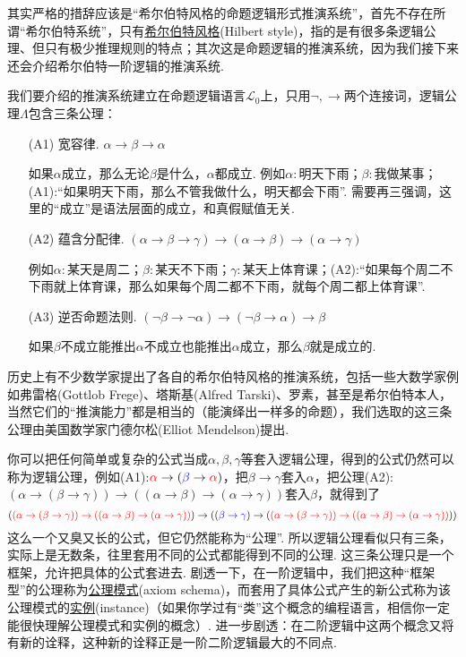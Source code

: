 \documentclass[main.tex]{subfiles}
\begin{document}
其实严格的措辞应该是“希尔伯特风格的命题逻辑形式推演系统”，首先不存在所谓“希尔伯特系统”，只有\uline{希尔伯特风格}(Hilbert style)，指的是有很多条逻辑公理、但只有极少推理规则的特点；其次这是命题逻辑的推演系统，因为我们接下来还会介绍希尔伯特一阶逻辑的推演系统. 

我们要介绍的推演系统建立在命题逻辑语言\(\mathcal{L}_0\)上，只用\(\neg, \to\)两个连接词，逻辑公理\(\Lambda\)包含三条公理：
\begin{itemize}
    \item [(A1)] 宽容律. \(\alpha \to \beta \to \alpha\)
    \begin{note}
        如果\(\alpha\)成立，那么无论\(\beta\)是什么，\(\alpha\)都成立. 例如\(\alpha:\)明天下雨；\(\beta:\)我做某事；(A1):“如果明天下雨，那么不管我做什么，明天都会下雨”. 需要再三强调，这里的“成立”是语法层面的成立，和真假赋值无关.
    \end{note}
    \item [(A2)] 蕴含分配律. \((\alpha \to \beta \to \gamma) \to (\alpha \to \beta) \to (\alpha \to \gamma)\)
    \begin{note}
        例如\(\alpha:\)某天是周二；\(\beta:\)某天不下雨；\(\gamma:\)某天上体育课；(A2):“如果每个周二不下雨就上体育课，那么如果每个周二都不下雨，就每个周二都上体育课”.
    \end{note}
    \item [(A3)] 逆否命题法则. \((\neg \beta \to \neg \alpha) \to (\neg \beta \to \alpha) \to \beta\)
    \begin{note}
        如果\(\beta\)不成立能推出\(\alpha\)不成立也能推出\(\alpha\)成立，那么\(\beta\)就是成立的.
    \end{note}
\end{itemize}

历史上有不少数学家提出了各自的希尔伯特风格的推演系统，包括一些大数学家例如弗雷格(Gottlob Frege)、塔斯基(Alfred Tarski)、罗素，甚至是希尔伯特本人，当然它们的“推演能力”都是相当的（能演绎出一样多的命题），我们选取的这三条公理由美国数学家门德尔松(Elliot Mendelson)提出.

你可以把任何简单或复杂的公式当成\(\alpha,\beta,\gamma\)等套入逻辑公理，得到的公式仍然可以称为逻辑公理，例如(A1):\({\color{red}\alpha} \to ({\color{blue}\beta} \to {\color{red}\alpha})\)，把\(\beta \to \gamma\)套入\(\alpha\)，把公理(A2):\((\alpha \to (\beta \to \gamma)) \to ((\alpha \to \beta) \to (\alpha \to \gamma))\)套入\(\beta\)，就得到了
\[({\color{red} (\alpha \to (\beta \to \gamma)) \to ((\alpha \to \beta) \to (\alpha \to \gamma))}) \to (({\color{blue}\beta \to \gamma}) \to ({\color{red}(\alpha \to (\beta \to \gamma)) \to ((\alpha \to \beta) \to (\alpha \to \gamma))}))\]
这么一个又臭又长的公式，但它仍然能称为“公理”. 所以逻辑公理看似只有三条，实际上是无数条，往里套用不同的公式都能得到不同的公理. 这三条公理只是一个框架，允许把具体的公式套进去. 剧透一下，在一阶逻辑中，我们把这种“框架型”的公理称为\uline{公理模式}(axiom schema)，而套用了具体公式产生的新公式称为该公理模式的\uline{实例}(instance)（如果你学过有“类”这个概念的编程语言，相信你一定能很快理解公理模式和实例的概念）. 进一步剧透：在二阶逻辑中这两个概念又将有新的诠释，这种新的诠释正是一阶二阶逻辑最大的不同点. 
\end{document}
